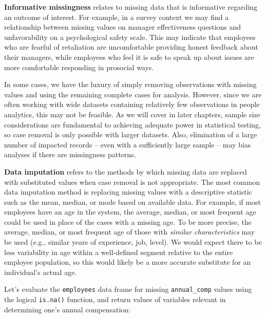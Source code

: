 \documentclass[]{book}
\begin{document}
\textbf{Informative missingness} relates to missing data that is informative regarding an outcome of interest. For example, in a survey context we may find a relationship between missing values on manager effectiveness questions and unfavorability on a psychological safety scale. This may indicate that employees who are fearful of retaliation are uncomfortable providing honest feedback about their managers, while employees who feel it is safe to speak up about issues are more comfortable responding in prosocial ways.

In some cases, we have the luxury of simply removing observations with missing values and using the remaining complete cases for analysis. However, since we are often working with wide datasets containing relatively few observations in people analytics, this may not be feasible. As we will cover in later chapters, sample size considerations are fundamental to achieving adequate power in statistical testing, so case removal is only possible with larger datasets. Also, elimination of a large number of impacted records -- even with a sufficiently large sample -- may bias analyses if there are missingness patterns.

\textbf{Data imputation} refers to the methods by which missing data are replaced with substituted values when case removal is not appropriate. The most common data imputation method is replacing missing values with a descriptive statistic such as the mean, median, or mode based on available data. For example, if most employees have an age in the system, the average, median, or most frequent age could be used in place of the cases with a missing age. To be more precise, the average, median, or most frequent age of those with \emph{similar characteristics} may be used (e.g., similar years of experience, job, level). We would expect there to be less variability in age within a well-defined segment relative to the entire employee population, so this would likely be a more accurate substitute for an individual's actual age.

Let's evaluate the \texttt{employees} data frame for missing \texttt{annual\_comp} values using the logical \texttt{is.na()} function, and return values of variables relevant in determining one's annual compensation:
\end{document}
